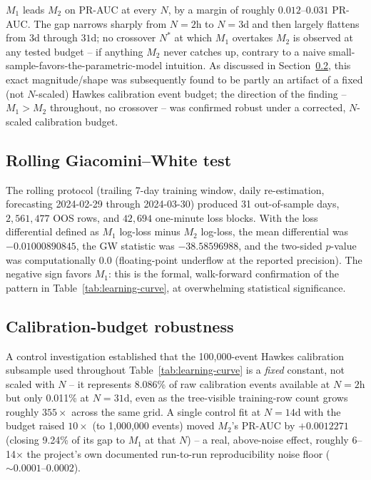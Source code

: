 $M_1$ leads $M_2$ on PR-AUC at every $N$, by a margin of roughly
$0.012$--$0.031$ PR-AUC. The gap narrows sharply from $N=2$h to
$N=3$d and then largely flattens from $3$d through $31$d; no crossover
$N^{*}$ at which $M_1$ overtakes $M_2$ is observed at any tested budget
-- if anything $M_2$ never catches up, contrary to a naive
small-sample-favors-the-parametric-model intuition. As discussed in
Section~\ref{sec:results-calibration}, this exact magnitude/shape was
subsequently found to be partly an artifact of a fixed (not $N$-scaled)
Hawkes calibration event budget; the direction of the finding --
$M_1 > M_2$ throughout, no crossover -- was confirmed robust under a
corrected, $N$-scaled calibration budget.

\subsection{Rolling Giacomini--White test}
\label{sec:results-gw}

The rolling protocol (trailing 7-day training window, daily
re-estimation, forecasting 2024-02-29 through 2024-03-30) produced 31
out-of-sample days, $2{,}561{,}477$ OOS rows, and $42{,}694$ one-minute
loss blocks. With the loss differential defined as $M_1$ log-loss minus
$M_2$ log-loss, the mean differential was $-0.01000890845$, the GW
statistic was $-38.58596988$, and the two-sided $p$-value was
computationally $0.0$ (floating-point underflow at the reported
precision). The negative sign favors $M_1$: this is the formal,
walk-forward confirmation of the pattern in
Table~\ref{tab:learning-curve}, at overwhelming statistical significance.

\subsection{Calibration-budget robustness}
\label{sec:results-calibration}

A control investigation established that the 100{,}000-event Hawkes
calibration subsample used throughout Table~\ref{tab:learning-curve} is a
\emph{fixed} constant, not scaled with $N$ -- it represents 8.086\% of
raw calibration events available at $N=2$h but only 0.011\% at $N=31$d,
even as the tree-visible training-row count grows roughly $355\times$
across the same grid. A single control fit at $N=14$d with the budget
raised $10\times$ (to 1{,}000{,}000 events) moved $M_2$'s PR-AUC by
$+0.0012271$ (closing 9.24\% of its gap to $M_1$ at that $N$) -- a real,
above-noise effect, roughly 6--14$\times$ the project's own documented
run-to-run reproducibility noise floor ($\sim 0.0001$--$0.0002$).

